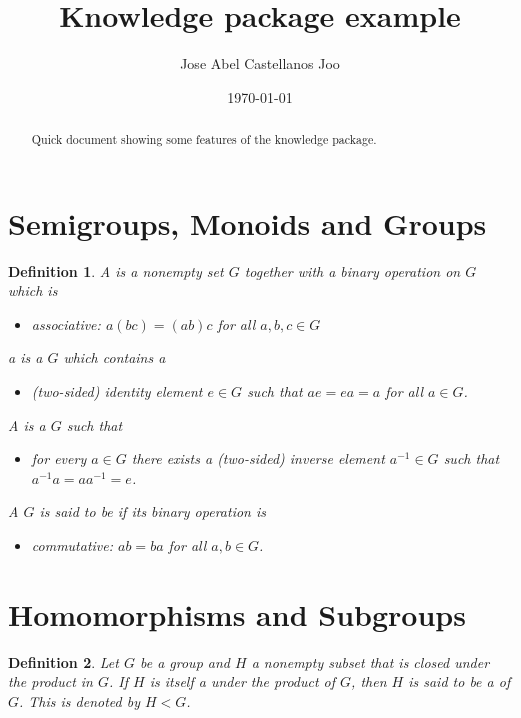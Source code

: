 \documentclass[a4paper]{article}
\title{Knowledge package example}
\author{Jose Abel Castellanos Joo}
\date{\today}
\newtheorem{definition}{Definition}[section]
\begin{document}
\maketitle

\begin{abstract}
  Quick document showing some features of the knowledge package.
\end{abstract}

\section{Semigroups, Monoids and Groups} \cite{Hungerford1980}

\begin{definition}
  A  is a nonempty set $G$ together
  with a binary operation on $G$ which is
  \begin{itemize}
    \item associative: $a(bc) = (ab)c$ for all $a, b, c \in G$
  \end{itemize}

  a  is a  $G$ which contains a 
  \begin{itemize}
    \item (two-sided) identity element $e \in G$ such that $ae = ea = a$ for all $a \in G$.
  \end{itemize}

  A is a  $G$ such that

  \begin{itemize}
    \item for every $a \in G$ there exists a (two-sided) inverse element $a^{-1} \in G$
      such that $a^{-1}a = aa^{-1} = e$.
  \end{itemize}

  A  $G$ is said to be  if its binary operation is
  \begin{itemize}
    \item commutative: $ab = ba$ for all $a, b \in G$.
  \end{itemize}
\end{definition}

\section{Homomorphisms and Subgroups}

\begin{definition}
  Let $G$ be a group and $H$ a nonempty
  subset that is closed under the product in $G$.
  If $H$ is itself a  under the product
  of $G$, then $H$ is said to be a  
  of $G$. This is denoted by $H < G$.
\end{definition}
\end{document}

